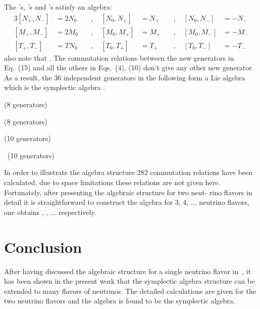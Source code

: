 \documentclass[a4paper,12pt]{article}
\begin{document}
The \coordHE{}'s, \coordHE{}'s and \coordHE{}'s satisfy an \coordHE{} algebra:
\begin{alignat}{3}
[N_{+},N_{-}]&=2N_{0} & \quad, \quad [N_{0},N_{+}]&=N_{+}  & \quad, \quad 
[N_{0},N_{-}]&=-N_{-} \\[0.2cm]
[M_{+},M_{-}]&=2M_{0} & \quad, \quad [M_{0},M_{+}]&=M_{+}  & \quad, \quad 
[M_{0},M_{-}]&=-M_{-} \\[0.2cm]
[T_{+},T_{-}]&=TN_{0} & \quad, \quad [T_{0},T_{+}]&=T_{+}  & \quad, \quad 
[T_{0},T_{-}]&=-T_{-} 
\end{alignat}
also note that \coordHE{}. The commutation relations 
between the  new 
generators in Eq.~(15) and all the others in Eqs.~(4), (10) don't give any other new generator. 
As a result, the 36 independent generators in the following form a Lie
algebra which is the symplectic algebra \coordHE{}. 
\vspace{8pt}

\qquad{}\coordHE{}(8 generators)\vspace{8pt}

\qquad {}\coordHE{}(8 generators)\vspace{8pt}

\qquad {}\coordHE{} \qquad (10 generators)\vspace{8pt}

\qquad {}\coordHE{}\ \coordHE{}(10 generators)
\vspace{8pt}

In order to illustrate the \coordHE{} algebra structure 282 commutation 
relations have been calculated, due to space limitations these relations 
are not given here. 
Fortunately, after presenting the algebraic structure for two neut- rino 
flavors in detail it is straightforward to construct the algebra for 
3, 4, ... neutrino flavors, one obtains \coordHE{}, \coordHE{}, ... respectively.
\section{Conclusion}
After having discussed the algebraic structure for a single neutrino flavor 
in~\cite{baha},
it has been shown in the present work that the symplectic algebra structure 
can be extended to many flavors of neutrinos. The detailed calculations 
are given for the two neutrino flavors and the algebra is found to be the 
\coordHE{} symplectic algebra. 
\end{document}

